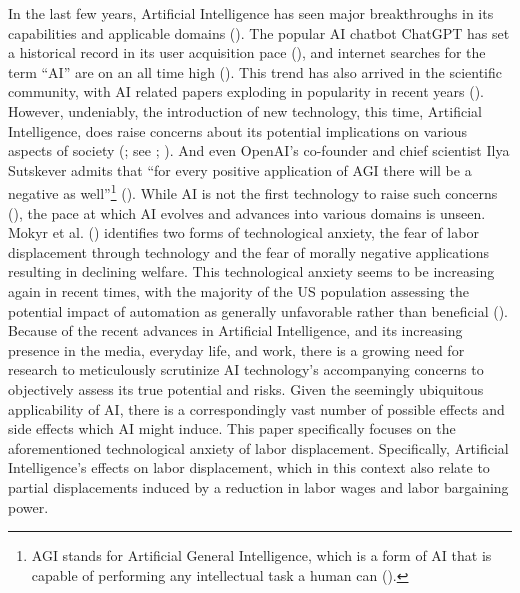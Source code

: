 \documentclass[
  12pt,
  a4paperpaper,
]{article}
\begin{document}
In the last few years, Artificial Intelligence has seen major
breakthroughs in its capabilities and applicable domains
(). The popular AI chatbot ChatGPT has set a historical
record in its user acquisition pace (), and internet searches for the term ``AI'' are on an all time
high (). This trend has
also arrived in the scientific community, with AI related papers
exploding in popularity in recent years
(). However, undeniably, the introduction of new technology, this
time, Artificial Intelligence, does raise concerns about its potential
implications on various aspects of society
(; see
; ). And even OpenAI's co-founder and chief scientist Ilya
Sutskever admits that ``for every positive application of AGI there will
be a negative as well''\footnote{AGI stands for Artificial General
  Intelligence, which is a form of AI that is capable of performing any
  intellectual task a human can ().} (). While AI is not the first technology to raise such concerns
(), the
pace at which AI evolves and advances into various domains is unseen.
Mokyr et al. () identifies
two forms of technological anxiety, the fear of labor displacement
through technology and the fear of morally negative applications
resulting in declining welfare. This technological anxiety seems to be
increasing again in recent times, with the majority of the US population
assessing the potential impact of automation as generally unfavorable
rather than beneficial
(). Because of
the recent advances in Artificial Intelligence, and its increasing
presence in the media, everyday life, and work, there is a growing need
for research to meticulously scrutinize AI technology's accompanying
concerns to objectively assess its true potential and risks. Given the
seemingly ubiquitous applicability of AI, there is a correspondingly
vast number of possible effects and side effects which AI might induce.
This paper specifically focuses on the aforementioned technological
anxiety of labor displacement. Specifically, Artificial Intelligence's
effects on labor displacement, which in this context also relate to
partial displacements induced by a reduction in labor wages and labor
bargaining power.
\end{document}
